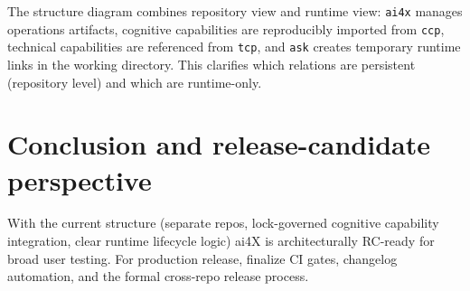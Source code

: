 \documentclass[a4paper,11pt]{article}
\begin{document}
\noindent
The structure diagram combines repository view and runtime view:
\texttt{ai4x} manages operations artifacts,
cognitive capabilities are reproducibly imported from \texttt{ccp},
technical capabilities are referenced from \texttt{tcp},
and \texttt{ask} creates temporary runtime links in the working directory.
This clarifies which relations are persistent (repository level)
and which are runtime-only.

\section{Conclusion and release-candidate perspective}
With the current structure (separate repos, lock-governed cognitive capability integration, clear runtime lifecycle logic)
ai4X is architecturally RC-ready for broad user testing.
For production release, finalize CI gates, changelog automation, and the formal cross-repo release process.
\end{document}
